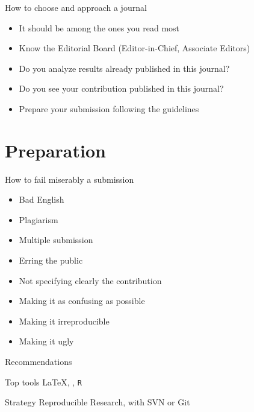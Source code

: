 \documentclass[professionalfonts,table,serif,aspectratio=1610]{beamer}
\begin{document}
\begin{frame}{How to choose and approach a journal}
\begin{itemize}[<+-| alert@+>]
\item It should be among the ones you read most
\item Know the Editorial Board (Editor-in-Chief, Associate Editors)
\item Do you analyze results already published in this journal?
\item Do you see your contribution published in this journal?
\item Prepare your submission following the guidelines
\end{itemize}
\end{frame}

\section{Preparation}

\begin{frame}{How to fail miserably a submission}
\begin{itemize}[<+-| alert@+>]
\item Bad English
\item Plagiarism
\item Multiple submission
\item Erring the public
\item Not specifying clearly the contribution
\item Making it as confusing as possible
\item Making it irreproducible
\item Making it ugly
\end{itemize}
\end{frame}

\begin{frame}{Recommendations}
\begin{alertblock}{Top tools}
\LaTeX, \BibTeX, \texttt R
\end{alertblock}

\begin{alertblock}{Strategy}
Reproducible Research, with SVN or Git
\end{alertblock}
\end{frame}
\end{document}
